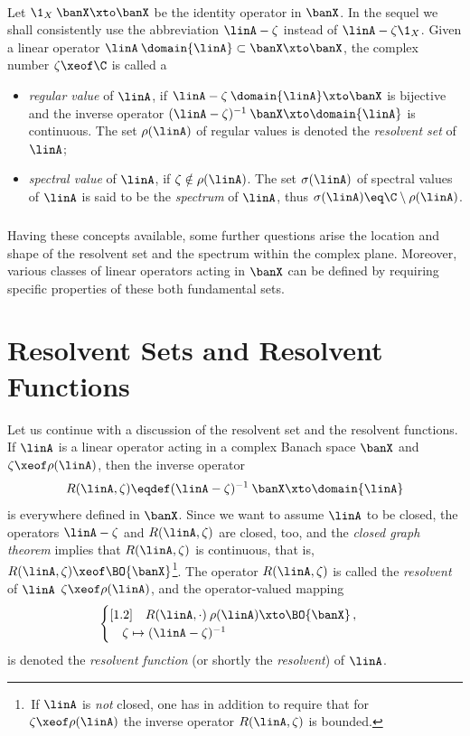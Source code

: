 \documentclass[11pt,twoside]{article}
\begin{document}
\paragraph{}
Let $\1_X \: \banX \xto \banX$ be the identity operator in $\banX$.
In the sequel we shall consistently use the abbreviation $\linA - \zeta$
instead of $\linA -\zeta \1_X$.
Given a linear operator
$\linA \: \domain{\linA} \subset \banX \xto \banX$,
the complex number $\zeta \xeof \C$ is called a

\begin{itemize}[leftmargin=12pt]
\item[1.]
\textit{regular value} of $\linA$,
if $\linA - \zeta \: \domain{\linA} \xto \banX$ is bijective and
the inverse operator $(\linA-\zeta)^{-1} \: \banX \xto \domain{\linA}$
is continuous.
The set $\rho(\linA)$ of regular values is denoted
the \textit{resolvent set} of $\linA$;

\item[2.]
\textit{spectral value} of $\linA$,
if $\zeta \notin \rho(\linA)$.
The set $\sigma(\linA)$ of spectral values of $\linA$ is said to be
the \textit{spectrum} of $\linA$,
thus $\sigma(\linA) \eq \C \setminus \rho(\linA)$.
\end{itemize}

\subparagraph{}
Having these concepts available,
some further questions arise {\wrt} the location and shape
of the resolvent set and the spectrum within the complex plane.
Moreover,
various classes of linear operators acting in $\banX$ can be defined
by requiring specific properties of these both fundamental sets.

\section{Resolvent Sets and Resolvent Functions}
Let us continue with a discussion of the resolvent set
and the resolvent functions.
If $\linA$ is a linear operator acting in a complex Banach space $\banX$
and $\zeta \xeof \rho(\linA)$,
then the inverse operator
\[
R(\linA,\zeta) \eqdef (\linA - \zeta)^{-1}\: \banX \xto \domain{\linA}
\]
is everywhere defined in $\banX$.
Since we want to assume $\linA$ to be closed,
the operators $\linA - \zeta$ and $R(\linA,\zeta)$ are closed,
too,
and the \textit{closed graph theorem}
implies that $R(\linA,\zeta)$ is continuous,
that is,
$R(\linA,\zeta) \xeof \BO{\banX}$\footnote{
\,If $\linA$ is \textit{not} closed,
one has in addition to require that
for $\zeta \xeof \rho(\linA)$ the inverse operator $R(\linA,\zeta)$
is bounded.}.
The operator $R(\linA,\zeta)$ is called the \textit{resolvent} of $\linA$
{\wrt} $\zeta \xeof \rho(\linA)$,
and the operator-valued mapping
\begin{equation}\label{VI_RESOLVENT_FUNCTION}
\begin{cases}[1.2]
\quad R(\linA,\cdot)\: \rho(\linA) \xto \BO{\banX}\,,\\
\quad \zeta \mapsto (\linA - \zeta)^{-1}\\
\end{cases}
\end{equation}
is denoted the \textit{resolvent function} (or shortly the \textit{resolvent})
of $\linA$.
\end{document}
